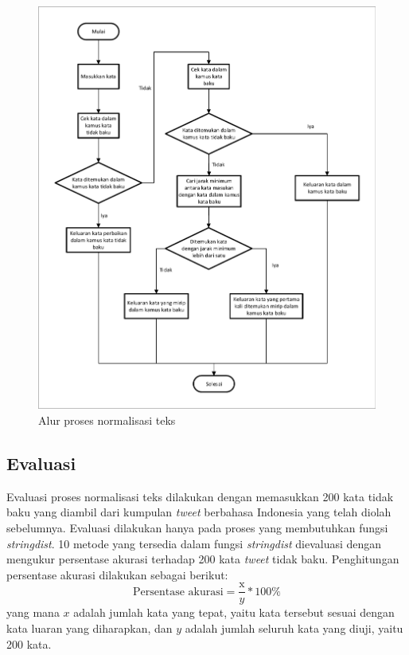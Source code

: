 \begin{figure}[H]
	\centering
	\includegraphics[width=\textwidth, trim=2 2 2 2, clip]{resources/2/flow_saragih.pdf}
	\caption{Alur proses normalisasi teks \parencite{saragih2017normalisasi}}
	\label{fig:flow_saragih}
\end{figure}

\subsection{Evaluasi}

Evaluasi proses normalisasi teks dilakukan dengan memasukkan 200 kata tidak baku yang diambil dari kumpulan \textit{tweet} berbahasa Indonesia yang telah diolah sebelumnya. Evaluasi dilakukan hanya pada proses yang membutuhkan fungsi \textit{stringdist}. 10 metode yang tersedia dalam fungsi \textit{stringdist} dievaluasi dengan mengukur persentase akurasi terhadap 200 kata \textit{tweet} tidak baku. Penghitungan persentase akurasi dilakukan sebagai berikut:
\begin{equation*}
	\text{Persentase akurasi}=\frac{\text{x}}{y}*100\%
\end{equation*}
\noindent
yang mana $x$ adalah jumlah kata yang tepat, yaitu kata tersebut sesuai dengan kata luaran yang diharapkan, dan $y$ adalah jumlah seluruh kata yang diuji, yaitu 200 kata.

